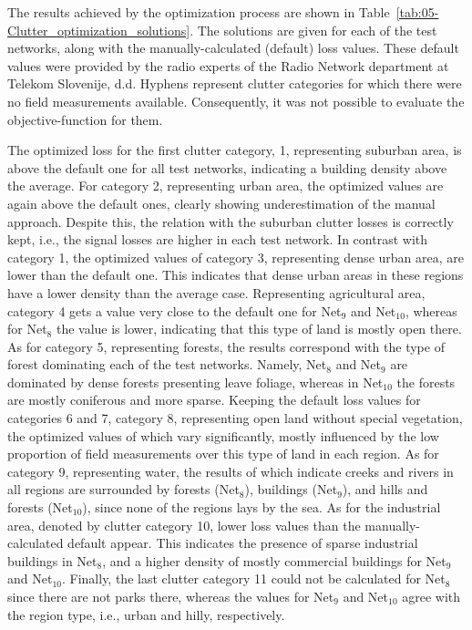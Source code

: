 The results achieved by the optimization process are shown in Table~\ref{tab:05-Clutter_optimization_solutions}.
The solutions are given for each of the test networks, along with
the manually-calculated (default) loss values. These default values
were provided by the radio experts of the Radio Network department
at Telekom Slovenije, d.d. Hyphens represent clutter categories for
which there were no field measurements available. Consequently, it
was not possible to evaluate the objective-function for them.

The optimized loss for the first clutter category, 1, representing
suburban area, is above the default one for all test networks, indicating
a building density above the average. For category 2, representing
urban area, the optimized values are again above the default ones,
clearly showing underestimation of the manual approach. Despite this,
the relation with the suburban clutter losses is correctly kept, i.e.,
the signal losses are higher in each test network. In contrast with
category 1, the optimized values of category 3, representing dense
urban area, are lower than the default one. This indicates that dense
urban areas in these regions have a lower density than the average
case. Representing agricultural area, category 4 gets a value very
close to the default one for Net$_{9}$ and Net$_{10}$, whereas for
Net$_{8}$ the value is lower, indicating that this type of land is
mostly open there. As for category 5, representing forests, the results
correspond with the type of forest dominating each of the test networks.
Namely, Net$_{8}$ and Net$_{9}$ are dominated by dense forests presenting
leave foliage, whereas in Net$_{10}$ the forests are mostly coniferous
and more sparse. Keeping the default loss values for categories 6
and 7, category 8, representing open land without special vegetation,
the optimized values of which vary significantly, mostly influenced
by the low proportion of field measurements over this type of land
in each region. As for category 9, representing water, the results
of which indicate creeks and rivers in all regions are surrounded
by forests (Net$_{8}$), buildings (Net$_{9}$), and hills and forests
(Net$_{10}$), since none of the regions lays by the sea. As for the
industrial area, denoted by clutter category 10, lower loss values
than the manually-calculated default appear. This indicates the presence
of sparse industrial buildings in Net$_{8}$, and a higher density
of mostly commercial buildings for Net$_{9}$ and Net$_{10}$. Finally,
the last clutter category 11 could not be calculated for Net$_{8}$
since there are not parks there, whereas the values for Net$_{9}$
and Net$_{10}$ agree with the region type, i.e., urban and hilly,
respectively.

